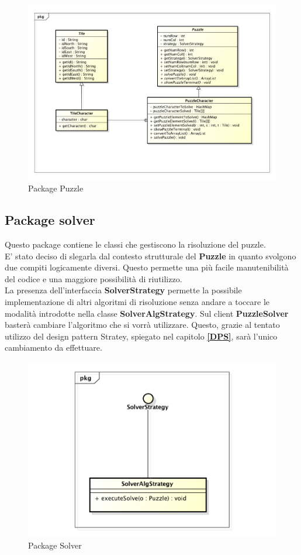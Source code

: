 		\begin{figure}[htbp]
			\centering
			\includegraphics[width=15cm]{img/Puzzle.pdf}
			\caption{Package Puzzle}
			\label{Package Puzzle}
		\end{figure}

	\subsection{Package solver}
Questo package contiene le classi che gestiscono la risoluzione del puzzle. \\
E' stato deciso di slegarla dal contesto strutturale del \textbf{Puzzle} in quanto svolgono due compiti logicamente diversi. Questo permette una più facile manutenibilità del codice e una maggiore possibilità di riutilizzo. \\
La presenza dell'interfaccia \textbf{SolverStrategy} permette la possibile implementazione di altri algoritmi di risoluzione senza andare a toccare le modalità introdotte nella classe \textbf{SolverAlgStrategy}. Sul client \textbf{PuzzleSolver} basterà cambiare l'algoritmo che si vorrà utilizzare. Questo, grazie al tentato utilizzo del design pattern Stratey, spiegato nel capitolo \textbf{\ref{DPS}}, sarà l'unico cambiamento da effettuare.
		\begin{figure}[htbp]
			\centering
			\includegraphics[width=15cm]{img/Solver.pdf}
			\caption{Package Solver}
			\label{Package Solver}
		\end{figure}
	
